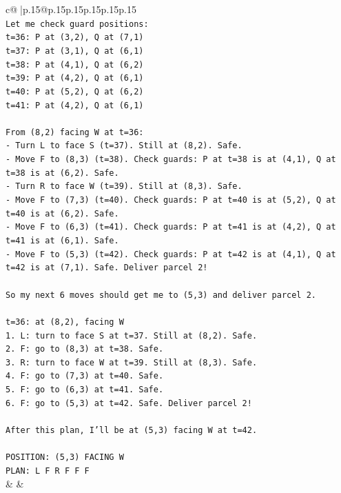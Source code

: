 \documentclass{article}
\begin{document}
{\begin{supertabular}{c@{$\;$}|p{.15\linewidth}@{}p{.15\linewidth}p{.15\linewidth}p{.15\linewidth}p{.15\linewidth}p{.15\linewidth}}
{{{\\ 
\texttt{Let me check guard positions:} \\
\texttt{t=36: P at (3,2), Q at (7,1)} \\
\texttt{t=37: P at (3,1), Q at (6,1)} \\
\texttt{t=38: P at (4,1), Q at (6,2)} \\
\texttt{t=39: P at (4,2), Q at (6,1)} \\
\texttt{t=40: P at (5,2), Q at (6,2)} \\
\texttt{t=41: P at (4,2), Q at (6,1)} \\
\\ 
\texttt{From (8,2) facing W at t=36:} \\
\texttt{{-} Turn L to face S (t=37). Still at (8,2). Safe.} \\
\texttt{{-} Move F to (8,3) (t=38). Check guards: P at t=38 is at (4,1), Q at t=38 is at (6,2). Safe.} \\
\texttt{{-} Turn R to face W (t=39). Still at (8,3). Safe.} \\
\texttt{{-} Move F to (7,3) (t=40). Check guards: P at t=40 is at (5,2), Q at t=40 is at (6,2). Safe.} \\
\texttt{{-} Move F to (6,3) (t=41). Check guards: P at t=41 is at (4,2), Q at t=41 is at (6,1). Safe.} \\
\texttt{{-} Move F to (5,3) (t=42). Check guards: P at t=42 is at (4,1), Q at t=42 is at (7,1). Safe. Deliver parcel 2!} \\
\\ 
\texttt{So my next 6 moves should get me to (5,3) and deliver parcel 2.} \\
\\ 
\texttt{t=36: at (8,2), facing W} \\
\texttt{1. L: turn to face S at t=37. Still at (8,2). Safe.} \\
\texttt{2. F: go to (8,3) at t=38. Safe.} \\
\texttt{3. R: turn to face W at t=39. Still at (8,3). Safe.} \\
\texttt{4. F: go to (7,3) at t=40. Safe.} \\
\texttt{5. F: go to (6,3) at t=41. Safe.} \\
\texttt{6. F: go to (5,3) at t=42. Safe. Deliver parcel 2!} \\
\\ 
\texttt{After this plan, I'll be at (5,3) facing W at t=42.} \\
\\ 
\texttt{POSITION: (5,3) FACING W} \\
\texttt{PLAN: L F R F F F} \\
            }
        }
    }
    & & \\ \\


\end{supertabular}}
\end{document}
